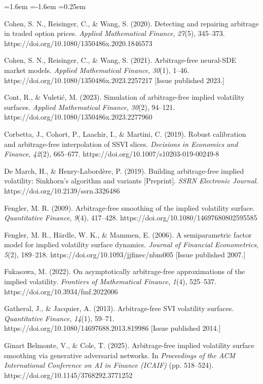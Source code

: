 \documentclass[11pt]{article}
\begin{document}
\begin{list}{}{\leftmargin=1.6em \itemindent=-1.6em \itemsep=0.25em}
\item Cohen, S. N., Reisinger, C., \& Wang, S. (2020). Detecting and repairing arbitrage in traded option prices. \textit{Applied Mathematical Finance}, \textit{27}(5), 345–373. https://doi.org/10.1080/1350486x.2020.1846573
\item Cohen, S. N., Reisinger, C., \& Wang, S. (2021). Arbitrage-free neural-SDE market models. \textit{Applied Mathematical Finance}, \textit{30}(1), 1–46. https://doi.org/10.1080/1350486x.2023.2257217 [Issue published 2023.]
\item Cont, R., \& Vuletić, M. (2023). Simulation of arbitrage-free implied volatility surfaces. \textit{Applied Mathematical Finance}, \textit{30}(2), 94–121. https://doi.org/10.1080/1350486x.2023.2277960
\item Corbetta, J., Cohort, P., Laachir, I., \& Martini, C. (2019). Robust calibration and arbitrage-free interpolation of SSVI slices. \textit{Decisions in Economics and Finance}, \textit{42}(2), 665–677. https://doi.org/10.1007/s10203-019-00249-8
\item De March, H., \& Henry-Labordère, P. (2019). Building arbitrage-free implied volatility: Sinkhorn's algorithm and variants [Preprint]. \textit{SSRN Electronic Journal}. https://doi.org/10.2139/ssrn.3326486
\item Fengler, M. R. (2009). Arbitrage-free smoothing of the implied volatility surface. \textit{Quantitative Finance}, \textit{9}(4), 417–428. https://doi.org/10.1080/14697680802595585
\item Fengler, M. R., Härdle, W. K., \& Mammen, E. (2006). A semiparametric factor model for implied volatility surface dynamics. \textit{Journal of Financial Econometrics}, \textit{5}(2), 189–218. https://doi.org/10.1093/jjfinec/nbm005 [Issue published 2007.]
\item Fukasawa, M. (2022). On asymptotically arbitrage-free approximations of the implied volatility. \textit{Frontiers of Mathematical Finance}, \textit{1}(4), 525–537. https://doi.org/10.3934/fmf.2022006
\item Gatheral, J., \& Jacquier, A. (2013). Arbitrage-free SVI volatility surfaces. \textit{Quantitative Finance}, \textit{14}(1), 59–71. https://doi.org/10.1080/14697688.2013.819986 [Issue published 2014.]
\item Ginart Belmonte, V., \& Cole, T. (2025). Arbitrage-free implied volatility surface smoothing via generative adversarial networks. In \textit{Proceedings of the ACM International Conference on AI in Finance (ICAIF)} (pp. 518–524). https://doi.org/10.1145/3768292.3771252

\end{list}
\end{document}
